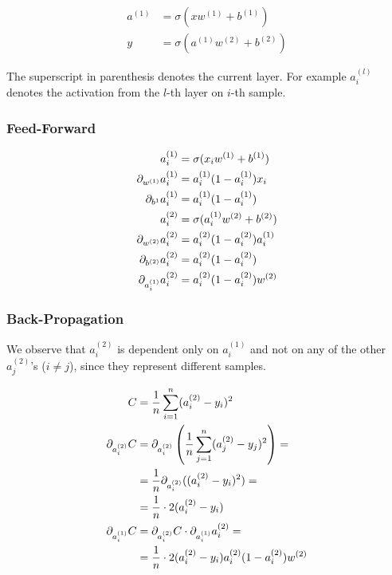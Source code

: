 \documentclass{article}
\begin{document}
\begin{align}
  a^{(1)} &= \sigma(xw^{(1)} + b^{(1)}) \\
  y &= \sigma(a^{(1)}w^{(2)} + b^{(2)})
\end{align}

The superscript in parenthesis denotes the current layer. For example $a_i^{(l)}$ denotes the activation from the $l$-th layer on $i$-th sample.

\subsubsection{Feed-Forward}

\begin{align}
  a_i^{(1)} &= \sigma(x_iw^{(1)} + b^{(1)}) \\
  \pd[w^{(1)}]a_i^{(1)} &= a_i^{(1)}(1 - a_i^{(1)})x_i \\
  \pd[b^{1}]a_i^{(1)} &= a_i^{(1)}(1 - a_i^{(1)}) \\
  a_i^{(2)} &= \sigma(a_i^{(1)}w^{(2)} + b^{(2)}) \\
  \pd[w^{(2)}]a_i^{(2)} &= a_i^{(2)}(1 - a_i^{(2)})a_i^{(1)} \\
  \pd[b^{(2)}]a_i^{(2)} &= a_i^{(2)}(1 - a_i^{(2)}) \\
  \pd[a_i^{(1)}]a_i^{(2)} &= a_i^{(2)}(1 - a_i^{(2)})w^{(2)}
\end{align}

\subsubsection{Back-Propagation}

We observe that $a_i^{(2)}$ is dependent only on $a_i^{(1)}$ and not on any of the other $a_j^{(2)}$'s ($i \neq j$), since they represent different samples.

\begin{align}
  C &= \avgsum[i, n] (a_i^{(2)} - y_i)^2 \\
  \pd[a_i^{(2)}] C
          &= \pd[a_i^{(2)}] \left( \avgsum[j, n] (a_j^{(2)} - y_j)^2 \right) = \\
          &= \frac{1}{n} \pd[a_i^{(2)}] ((a_i^{(2)} - y_i)^2) = \\
          &= \frac{1}{n} \cdot 2(a_i^{(2)} - y_i)\\
  \pd[a_i^{(1)}] C
          &= \pd[a_i^{(2)}] C \cdot \pd[a_i^{(1)}] a_i^{(2)} = \\
          &= \frac{1}{n} \cdot 2(a_i^{(2)} - y_i) a_i^{(2)}(1 - a_i^{(2)})w^{(2)}
\end{align}
\end{document}
